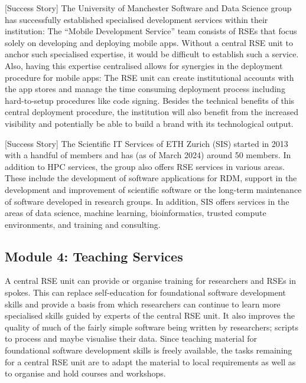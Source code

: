 \documentclass[a4paper]{article}
\begin{document}
[Success Story]
The University of Manchester Software and Data Science group has successfully established specialised development services within their institution:
The “Mobile Development Service” \autocite{manchester_mobile} team consists of RSEs that focus solely on developing and deploying mobile apps.
Without a central RSE unit to anchor such specialised expertise, it would be difficult to establish such a service.
Also, having this expertise centralised allows for synergies in the deployment procedure for mobile apps:
The RSE unit can create institutional accounts with the app stores and manage the time consuming deployment process including hard-to-setup procedures like code signing.
Besides the technical benefits of this central deployment procedure, the institution will also benefit from the increased visibility and potentially be able to build a brand with its technological output.

[Success Story]
The Scientific IT Services of ETH Zurich (SIS) started in 2013 with a handful of members and has (as of March 2024) around 50 members.
In addition to HPC services, the group also offers RSE services in various areas.
These include the development of software applications for RDM, support in the development and improvement of scientific software or the long-term maintenance of software developed in research groups.
In addition, SIS offers services in the areas of data science, machine learning, bioinformatics, trusted compute environments, and training and consulting.

\subsection{Module 4: Teaching Services}%
\label{sec:teaching}

A central RSE unit can provide or organise training for researchers and RSEs in spokes.
This can replace self-education for foundational software development skills and provide a basis from which researchers can continue to learn more specialised skills guided by experts of the central RSE unit.
It also improves the quality of much of the fairly simple software being written by researchers; scripts to process and maybe visualise their data.
Since teaching material for foundational software development skills is freely available,
the tasks remaining for a central RSE unit are to adapt the material to local requirements as well as to organise and hold courses and workshops.
\end{document}
